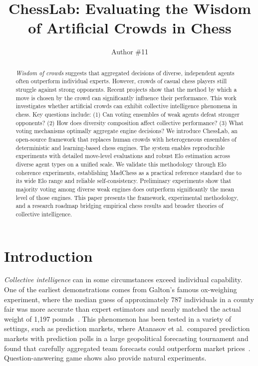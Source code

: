 \documentclass{article}
\title{ChessLab: Evaluating the Wisdom of Artificial Crowds in Chess}
\author{
    Author \#11
}
\begin{document}
\maketitle


\begin{abstract}
  \emph{Wisdom of crowds} suggests that aggregated decisions of diverse, independent agents often outperform individual experts.
  However, crowds of casual chess players still struggle against strong opponents.
  Recent projects show that the method by which a move is chosen by the crowd can significantly influence their performance.
  This work investigates whether artificial crowds can exhibit collective intelligence phenomena in chess.
  Key questions include: (1) Can voting ensembles of weak agents defeat stronger opponents? (2) How does diversity composition affect collective performance? (3) What voting mechanisms optimally aggregate engine decisions?
  We introduce ChessLab, an open-source framework that replaces human crowds with heterogeneous ensembles of deterministic and learning-based chess engines.
  The system enables reproducible experiments with detailed move-level evaluations and robust Elo estimation across diverse agent types on a unified scale.
  We validate this methodology through Elo coherence experiments, establishing MadChess as a practical reference standard due to its wide Elo range and reliable self-consistency.
  Preliminary experiments show that majority voting among diverse weak engines does outperform significantly the mean level of those engines.
  This paper presents the framework, experimental methodology, and a research roadmap bridging empirical chess results and broader theories of collective intelligence.
\end{abstract}

\section{Introduction}

\emph{Collective intelligence} can in some circumstances exceed individual capability.
One of the earliest demonstrations comes from Galton's famous ox-weighing experiment, where the median guess of approximately 787 individuals in a county fair was more accurate than expert estimators and nearly matched the actual weight of 1,197 pounds~\cite{galton1907}.
This phenomenon has been tested in a variety of settings, such as prediction markets, where Atanasov et al.\ compared prediction markets with prediction polls in a large geopolitical forecasting tournament and found that carefully aggregated team forecasts could outperform market prices~\cite{atanasov2017}.
Question-answering game shows also provide natural experiments.
\end{document}
